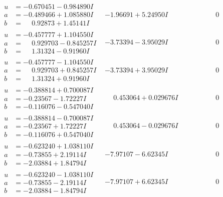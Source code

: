 \documentclass[1p]{elsarticle_modified}
\theoremstyle{definition}
\begin{document}
$$\begin{array}{c|c|c}
\begin{aligned}
u &= -0.670451 - 0.984890 I \\
a &= -0.489466 + 1.085880 I \\
b &= \phantom{-}0.92873 + 1.45141 I\end{aligned}
 & -1.96691 + 5.24950 I & \phantom{-0.000000 } 0 \\ \hline\begin{aligned}
u &= -0.457777 + 1.104550 I \\
a &= \phantom{-}0.929703 - 0.845257 I \\
b &= \phantom{-}1.31324 - 0.91960 I\end{aligned}
 & -3.73394 - 3.95029 I & \phantom{-0.000000 } 0 \\ \hline\begin{aligned}
u &= -0.457777 - 1.104550 I \\
a &= \phantom{-}0.929703 + 0.845257 I \\
b &= \phantom{-}1.31324 + 0.91960 I\end{aligned}
 & -3.73394 + 3.95029 I & \phantom{-0.000000 } 0 \\ \hline\begin{aligned}
u &= -0.388814 + 0.700087 I \\
a &= -0.23567 - 1.72227 I \\
b &= -0.116076 - 0.547040 I\end{aligned}
 & \phantom{-}0.453064 + 0.029676 I & \phantom{-0.000000 } 0 \\ \hline\begin{aligned}
u &= -0.388814 - 0.700087 I \\
a &= -0.23567 + 1.72227 I \\
b &= -0.116076 + 0.547040 I\end{aligned}
 & \phantom{-}0.453064 - 0.029676 I & \phantom{-0.000000 } 0 \\ \hline\begin{aligned}
u &= -0.623240 + 1.038110 I \\
a &= -0.73855 + 2.19114 I \\
b &= -2.03884 + 1.84794 I\end{aligned}
 & -7.97107 - 6.62345 I & \phantom{-0.000000 } 0 \\ \hline\begin{aligned}
u &= -0.623240 - 1.038110 I \\
a &= -0.73855 - 2.19114 I \\
b &= -2.03884 - 1.84794 I\end{aligned}
 & -7.97107 + 6.62345 I & \phantom{-0.000000 } 0 \\ \hline\begin{aligned}

\end{aligned}
\end{array}$$
\end{document}
